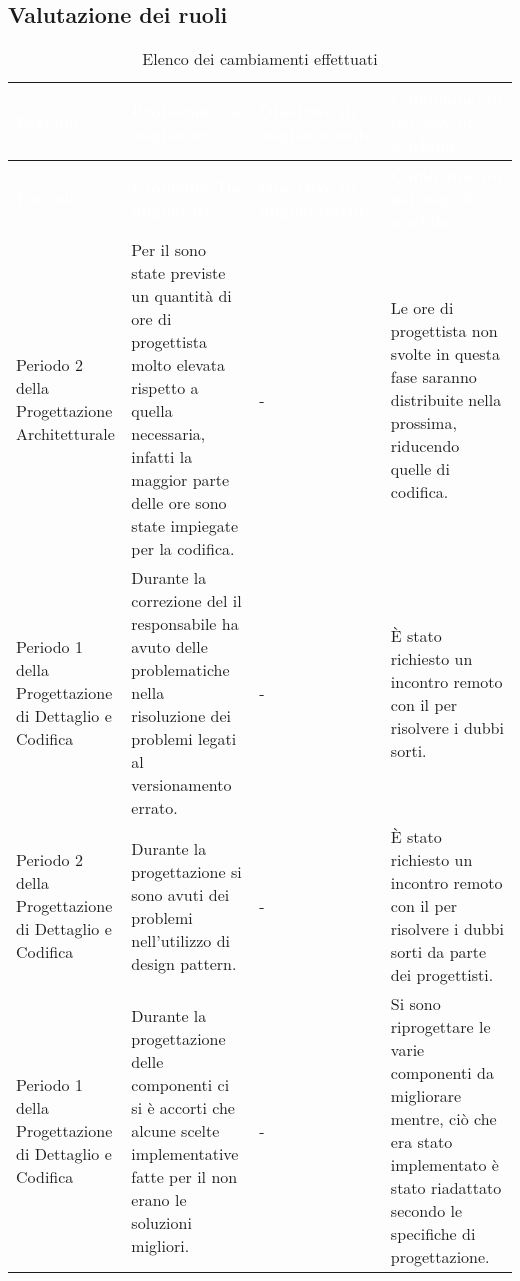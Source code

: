 \subsection{Valutazione dei ruoli}

{
	\renewcommand{\arraystretch}{1.5}
	\centering
	\begin{longtable}{ C{3cm} C{4cm} C{3cm} C{4cm}}
		\caption{Elenco dei cambiamenti effettuati}\\
		\textcolor{white}{\textbf{Periodo}} & \textcolor{white}{\textbf{Problema/Da migliorare}} & \textcolor{white}{\textbf{Obiettivo di miglioramento}} & \textcolor{white}{\textbf{Cambiamento nel way of working}}\\
		\endfirsthead
		\textcolor{white}{\textbf{Periodo}} & \textcolor{white}{\textbf{Problema/Da migliorare}} &
		\textcolor{white}{\textbf{Obiettivo di miglioramento}} & \textcolor{white}{\textbf{Cambiamento nel way of working}}\\
		\endhead
		
		Periodo 2 della Progettazione Architetturale & Per il  sono state previste un quantità di ore di progettista molto elevata rispetto a quella necessaria, infatti la maggior parte delle ore sono state impiegate per la codifica. & - & Le ore di progettista non svolte in questa fase saranno distribuite nella prossima, riducendo quelle di codifica.\\
		
		Periodo 1 della Progettazione di Dettaglio e Codifica & Durante la correzione del \PdP{} il responsabile ha avuto delle problematiche nella risoluzione dei problemi legati al versionamento errato. & - & È stato richiesto un incontro remoto con il \VT{} per risolvere i dubbi sorti.\\
		
		Periodo 2 della Progettazione di Dettaglio e Codifica & Durante la progettazione si sono avuti dei problemi nell'utilizzo di design pattern. & - & È stato richiesto un incontro remoto con il \CR{} per risolvere i dubbi sorti da parte dei progettisti.\\
		
		Periodo 1 della Progettazione di Dettaglio e Codifica & Durante la progettazione delle componenti ci si è accorti che alcune scelte implementative fatte per il  non erano le soluzioni migliori. & - & Si sono riprogettare le varie componenti da migliorare mentre, ciò che era stato implementato è stato riadattato secondo le specifiche di progettazione. \\
		

\end{longtable}}
